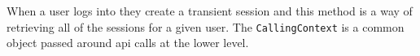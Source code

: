 When a user logs into \Rapture they create a transient session and this method is a way of retrieving all of the sessions
for a given user. The \verb+CallingContext+ is a common object passed around \Rapture api calls at the lower level.
